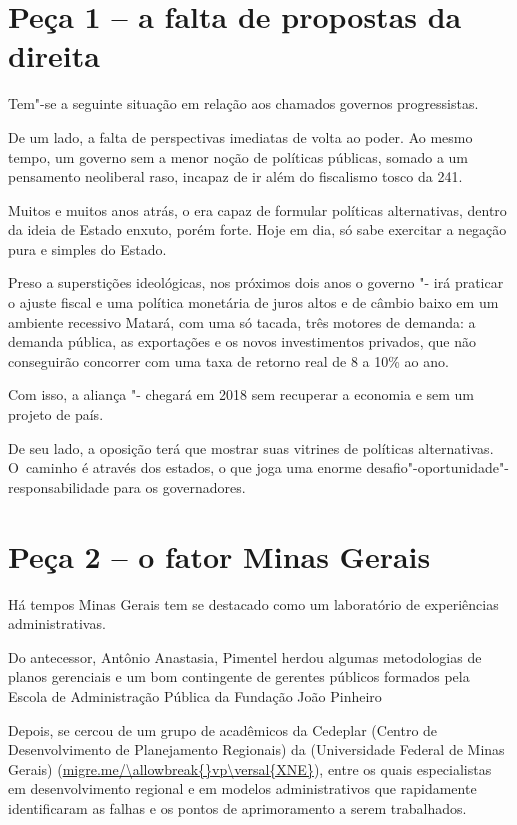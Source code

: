  

\section{Peça 1 -- a falta de propostas da direita}

Tem"-se a seguinte situação em relação aos chamados governos
progressistas.

De um lado, a falta de perspectivas imediatas de volta ao poder. Ao
mesmo tempo, um governo sem a menor noção de políticas públicas, somado
a um pensamento neoliberal raso, incapaz de ir além do fiscalismo tosco
da  241.

Muitos e muitos anos atrás, o  era capaz de formular políticas
alternativas, dentro da ideia de Estado enxuto, porém forte. Hoje em
dia, só sabe exercitar a negação pura e simples do Estado.

Preso a superstições ideológicas, nos próximos dois anos o governo
"- irá praticar o ajuste fiscal e uma política monetária de juros
altos e de câmbio baixo em um ambiente recessivo Matará, com uma só
tacada, três motores de demanda: a demanda pública, as exportações e os
novos investimentos privados, que não conseguirão concorrer com uma taxa
de retorno real de 8 a 10\% ao ano.

Com isso, a aliança "- chegará em 2018 sem recuperar a economia e
sem um projeto de país.

De seu lado, a oposição terá que mostrar suas vitrines de políticas
alternativas. O~caminho é através dos estados, o que joga uma enorme
desafio"-oportunidade"-responsabilidade para os governadores.

\section{Peça 2 -- o fator Minas Gerais}

Há tempos Minas Gerais tem se destacado como um laboratório de
experiências administrativas.

Do antecessor, Antônio Anastasia, Pimentel herdou algumas metodologias
de planos gerenciais e um bom contingente de gerentes públicos formados
pela Escola de Administração Pública da Fundação João Pinheiro

Depois, se cercou de um grupo de acadêmicos da Cedeplar (Centro de
Desenvolvimento de Planejamento Regionais) da  (Universidade Federal
de Minas Gerais) (\url{migre.me/\allowbreak{}vp\versal{XNE}}), entre os quais
especialistas em desenvolvimento regional e em modelos administrativos
que rapidamente identificaram as falhas e os pontos de aprimoramento a
serem trabalhados.

